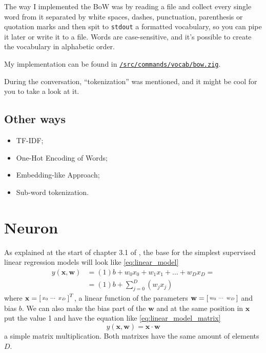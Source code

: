 \documentclass[a4paper,12pt]{article}
\theoremstyle{mytheoremstyle}
\theoremstyle{mytheoremstyle}
\theoremstyle{myproblemstyle}
\begin{document}
    The way I implemented the BoW was by reading a file and collect every
    single word from it separated by white spaces, dashes, punctuation,
    parenthesis or quotation marks and then spit to \texttt{stdout} a formatted
    vocabulary, so you can pipe it later or write it to a file. Words are
    case-sensitive, and it's possible to create the vocabulary in alphabetic
    order.

    My implementation can be found in
    \href{run:../src/commands/vocab/bow.zig}{\texttt{/src/commands/vocab/bow.zig}}.

    During the conversation, ``tokenization'' was mentioned, and it might be
    cool for you to take a look at it.

    \subsection{Other ways}

    \begin{itemize}
        \item TF-IDF;
        \item One-Hot Encoding of Words;
        \item Embedding-like Approach;
        \item Sub-word tokenization.
    \end{itemize}

    \section{Neuron}

    As explained at the start of chapter 3.1 of \cite{bishop}, the base for the
    simplest supervised linear regression models will look like
    \eqref{eq:linear_model}
    \begin{equation}
        \begin{split}
            y(\mathbf{x}, \mathbf{w}) & = (1)b + w_{0}x_{0} + w_{1}x_{1} +
            \ldots + w_{D}x_{D} = \\ & = (1)b +
            \displaystyle\sum_{j=0}^{D}\left(w_{j}x_{j}\right)
        \end{split}
        \label{eq:linear_model}
    \end{equation}
    where $ \mathbf{x} =
    \begin{bsmallmatrix}x_{0}&\cdots&x_{D}\end{bsmallmatrix}^{T} $, a linear
    function of the parameters $ \mathbf{w} =
    \begin{bsmallmatrix}w_{0}&\cdots&w_{D}\end{bsmallmatrix} $ and bias $b$. We
    can also make the bias part of the $ \mathbf{w} $ and at the same position
    in $ \mathbf{x} $ put the value 1 and have the equation like
    \eqref{eq:linear_model_matrix}
    \begin{equation}
        y(\mathbf{x}, \mathbf{w}) = \mathbf{x}\cdot\mathbf{w}
        \label{eq:linear_model_matrix}
    \end{equation}
    a simple matrix multiplication. Both matrixes have the same amount of
    elements $ D $.
\end{document}
